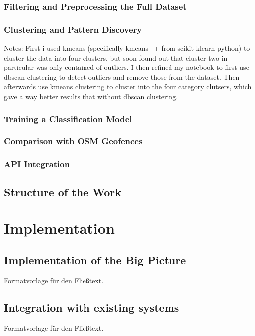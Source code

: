 \documentclass[a4paper,12pt,twoside]{scrreprt}
\begin{document}
\subsection{Filtering and Preprocessing the Full Dataset}

\subsection{Clustering and Pattern Discovery}

Notes:
First i used kmeans (specifically kmeans++ from scikit-klearn python) to
cluster the data into four clusters, but soon found out
that cluster two in particular was only contained of outliers.
I then refined my notebook to first use dbscan clustering to detect outliers
and remove those from the dataset. Then afterwards use kmeans clustering to
cluster into the four category clutsers, which gave a way better results that
without dbscan clustering.

\subsection{Training a Classification Model}

\subsection{Comparison with OSM Geofences}

\subsection{API Integration}

\section{Structure of the Work}

\chapter{Implementation}

\section{Implementation of the Big Picture}
Formatvorlage für den Fließtext.

\section{Integration with existing systems}
Formatvorlage für den Fließtext.
\end{document}
